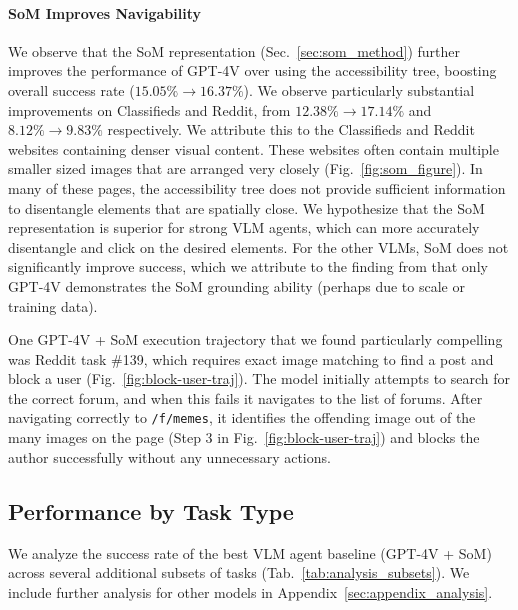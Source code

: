 \paragraph{SoM Improves Navigability} We observe that the SoM representation (Sec.~\ref{sec:som_method}) further improves the performance of GPT-4V over using the accessibility tree, boosting overall success rate ($15.05\% \rightarrow 16.37\%$). We observe particularly substantial improvements on Classifieds and Reddit, from $12.38\% \rightarrow 17.14\%$ and $8.12\% \rightarrow 9.83\%$ respectively. 
We attribute this to the Classifieds and Reddit websites containing denser visual content. These websites often contain multiple smaller sized images that are arranged very closely (Fig.~\ref{fig:som_figure}). In many of these pages, the accessibility tree does not provide sufficient information to disentangle elements that are spatially close. 
We hypothesize that the SoM representation is superior for strong VLM agents, which can more accurately disentangle and click on the desired elements. 
For the other VLMs, SoM does not significantly improve success, which we attribute to the finding from \citet{yang2023som} that only GPT-4V demonstrates the SoM grounding ability (perhaps due to scale or training data). %

One GPT-4V + SoM execution trajectory that we found particularly compelling was Reddit task \#139, which requires exact image matching to find a post and block a user (Fig.~\ref{fig:block-user-traj}). The model initially attempts to search for the correct forum, and when this fails it navigates to the list of forums. After navigating correctly to \texttt{/f/memes}, it identifies the offending image out of the many images on the page (Step 3 in Fig.~\ref{fig:block-user-traj}) and blocks the author successfully without any unnecessary actions. 

\subsection{Performance by Task Type}  \label{sec:performance_task_subset}

We analyze the success rate of the best VLM agent baseline (GPT-4V + SoM) across several additional subsets of tasks (Tab.~\ref{tab:analysis_subsets}). We include further analysis for other models in Appendix~\ref{sec:appendix_analysis}.

